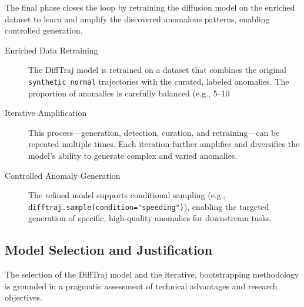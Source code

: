 \documentclass[runningheads]{llncs}
\begin{document}
The final phase closes the loop by retraining the diffusion model on the enriched dataset to learn and amplify the discovered anomalous patterns, enabling controlled generation.

\begin{description}
    \item[Enriched Data Retraining] The DiffTraj model is retrained on a dataset that combines the original \texttt{synthetic\_normal} trajectories with the curated, labeled anomalies. The proportion of anomalies is carefully balanced (e.g., 5--10%
    \item[Iterative Amplification] This process---generation, detection, curation, and retraining---can be repeated multiple times. Each iteration further amplifies and diversifies the model's ability to generate complex and varied anomalies.
    \item[Controlled Anomaly Generation] The refined model supports conditional sampling (e.g., \texttt{difftraj.sample(condition="speeding")}), enabling the targeted generation of specific, high-quality anomalies for downstream tasks.
\end{description}

\subsection{Model Selection and Justification}
\label{sec:model-selection}

The selection of the DiffTraj model and the iterative, bootstrapping methodology is grounded in a pragmatic assessment of technical advantages and research objectives.
\end{document}
